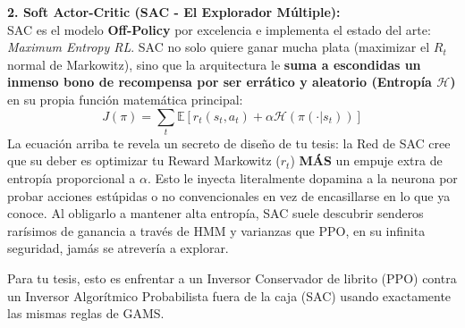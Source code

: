 \documentclass[11pt]{article}
\begin{document}
\textbf{2. Soft Actor-Critic (SAC - El Explorador Múltiple):}\\
SAC es el modelo \textbf{Off-Policy} por excelencia e implementa el estado del arte: \textit{Maximum Entropy RL}. SAC no solo quiere ganar mucha plata (maximizar el $R_t$ normal de Markowitz), sino que la arquitectura le \textbf{suma a escondidas un inmenso bono de recompensa por ser errático y aleatorio (Entropía $\mathcal{H}$)} en su propia función matemática principal:
\begin{equation}
J(\pi) = \sum_{t} \mathbb{E} \left[ r_t(s_t, a_t) + \alpha \mathcal{H}(\pi(\cdot|s_t)) \right]
\end{equation}
La ecuación arriba te revela un secreto de diseño de tu tesis: la Red de SAC cree que su deber es optimizar tu Reward Markowitz ($r_t$) \textbf{MÁS} un empuje extra de entropía proporcional a $\alpha$. Esto le inyecta literalmente dopamina a la neurona por probar acciones estúpidas o no convencionales en vez de encasillarse en lo que ya conoce. Al obligarlo a mantener alta entropía, SAC suele descubrir senderos rarísimos de ganancia a través de HMM y varianzas que PPO, en su infinita seguridad, jamás se atrevería a explorar.

Para tu tesis, esto es enfrentar a un Inversor Conservador de librito (PPO) contra un Inversor Algorítmico Probabilista fuera de la caja (SAC) usando exactamente las mismas reglas de GAMS.
\end{document}
